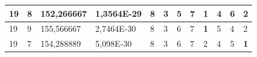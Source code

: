 \documentclass[conference]{IEEEtran}
\begin{document}
\begin{table}[]
\begin{tabular}{|llll|llllllll|}
\multicolumn{1}{|l|}{19}                                                    & \multicolumn{1}{l|}{8}                                                        & \multicolumn{1}{l|}{152,266667}                                                   & 1,3564E-29                     & \multicolumn{1}{l|}{8}                                                  & \multicolumn{1}{l|}{3}                                                  & \multicolumn{1}{l|}{5}                                                  & \multicolumn{1}{l|}{7}                                                  & \multicolumn{1}{l|}{\textbf{1}}                                         & \multicolumn{1}{l|}{4}                                                  & \multicolumn{1}{l|}{6}                                                  & 2                          \\ \hline
\multicolumn{1}{|l|}{19}                                                    & \multicolumn{1}{l|}{9}                                                        & \multicolumn{1}{l|}{155,566667}                                                   & 2,7464E-30                     & \multicolumn{1}{l|}{8}                                                  & \multicolumn{1}{l|}{3}                                                  & \multicolumn{1}{l|}{6}                                                  & \multicolumn{1}{l|}{7}                                                  & \multicolumn{1}{l|}{\textbf{1}}                                         & \multicolumn{1}{l|}{5}                                                  & \multicolumn{1}{l|}{4}                                                  & 2                          \\ \hline
\multicolumn{1}{|l|}{19}                                                    & \multicolumn{1}{l|}{7}                                                        & \multicolumn{1}{l|}{154,288889}                                                   & 5,098E-30                      & \multicolumn{1}{l|}{8}                                                  & \multicolumn{1}{l|}{3}                                                  & \multicolumn{1}{l|}{6}                                                  & \multicolumn{1}{l|}{7}                                                  & \multicolumn{1}{l|}{2}                                                  & \multicolumn{1}{l|}{4}                                                  & \multicolumn{1}{l|}{5}                                                  & \textbf{1}                 \\ \hline

\end{tabular}
\end{table}
\end{document}
